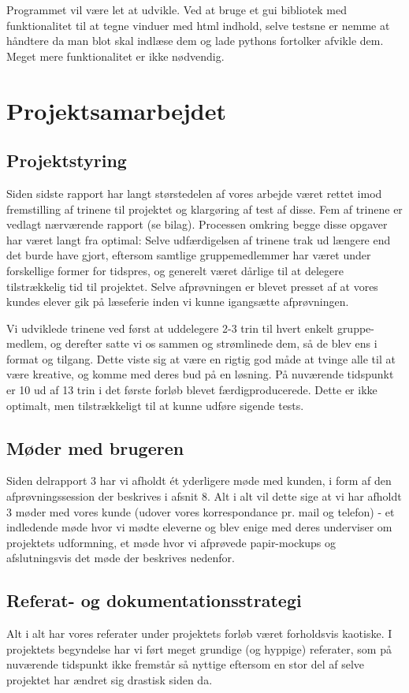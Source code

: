 \documentclass[10pt,a4paper,danish]{article}
\begin{document}
Programmet vil være let at udvikle. Ved at bruge et gui bibliotek med funktionalitet til at tegne vinduer med html indhold, selve testsne er nemme at håndtere da man blot skal indlæse dem og lade pythons fortolker afvikle dem. Meget mere funktionalitet er ikke nødvendig.



\section{Projektsamarbejdet}
\subsection{Projektstyring}
Siden sidste rapport har langt størstedelen af vores arbejde været rettet imod
fremstilling af trinene til projektet og klargøring af test af disse. Fem af trinene
er vedlagt nærværende rapport (se bilag). Processen
omkring begge disse opgaver har været langt fra optimal: Selve udfærdigelsen af 
trinene trak ud længere end det burde have gjort, eftersom samtlige gruppemedlemmer
har været under forskellige former for tidspres, og generelt været dårlige til 
at delegere tilstrækkelig tid til projektet. Selve afprøvningen er blevet presset
af at vores kundes elever gik på læseferie inden vi kunne igangsætte afprøvningen. 

Vi udviklede trinene ved først at uddelegere 2-3 trin til hvert enkelt gruppe-
medlem, og derefter satte vi os sammen og strømlinede dem, så de blev ens i
format og tilgang. Dette viste sig at være en rigtig god måde at tvinge alle
til at være kreative, og komme med deres bud på en løsning. På nuværende tidspunkt
er 10 ud af 13 trin i det første forløb blevet færdigproducerede. Dette er ikke 
optimalt, men tilstrækkeligt til at kunne udføre sigende tests.

\subsection{Møder med brugeren}
Siden delrapport 3 har vi afholdt ét yderligere møde med kunden, i form af 
den afprøvningssession der beskrives i afsnit 8. Alt i alt vil dette sige 
at vi har afholdt 3 møder med vores kunde (udover vores korrespondance pr. 
mail og telefon) - et indledende møde hvor vi mødte eleverne og blev enige
med deres underviser om projektets udformning, et møde hvor vi afprøvede 
papir-mockups og afslutningsvis det møde der beskrives nedenfor. 

\subsection{Referat- og dokumentationsstrategi}
Alt i alt har vores referater under projektets forløb været forholdsvis 
kaotiske. I projektets begyndelse har vi ført meget grundige (og hyppige)
referater, som på nuværende tidspunkt ikke fremstår så nyttige eftersom 
en stor del af selve projektet har ændret sig drastisk siden da. 
\end{document}
